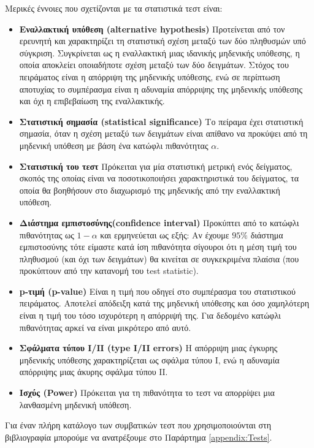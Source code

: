 Μερικές έννοιες που σχετίζονται με τα στατιστικά τεστ είναι:
\begin{itemize}
	\item \textbf{Εναλλακτική υπόθεση (alternative hypothesis)} Προτείνεται από τον ερευνητή και χαρακτηρίζει τη στατιστική σχέση μεταξύ των δύο πληθυσμών υπό σύγκριση. Συγκρίνεται ως η εναλλακτική μιας ιδανικής μηδενικής υπόθεσης, η οποία αποκλείει οποιαδήποτε σχέση μεταξύ των δύο δειγμάτων. Στόχος του πειράματος είναι η απόρριψη της μηδενικής υπόθεσης, ενώ σε περίπτωση αποτυχίας το συμπέρασμα είναι η αδυναμία απόρριψης της μηδενικής υπόθεσης και όχι η επιβεβαίωση της εναλλακτικής.
	\item \textbf{Στατιστική σημασία (statistical significance)} Το πείραμα έχει στατιστική σημασία, όταν η σχέση μεταξύ των δειγμάτων είναι απίθανο να προκύψει από τη μηδενική υπόθεση με βάση ένα κατώφλι πιθανότητας $\alpha$.
	\item \textbf{Στατιστική του τεστ} Πρόκειται για μία στατιστική μετρική ενός δείγματος, σκοπός της οποίας είναι να ποσοτικοποιήσει χαρακτηριστικά του δείγματος, τα οποία θα βοηθήσουν στο διαχωρισμό της μηδενικής από την εναλλακτική υπόθεση.
	\item \textbf{Διάστημα εμπιστοσύνης(confidence interval)}  Προκύπτει από το κατώφλι πιθανότητας ως $1-\alpha$ και ερμηνεύεται ως εξής: Αν έχουμε $95 \%$ διάστημα εμπιστοσύνης τότε είμαστε κατά ίση πιθανότητα σίγουροι ότι η μέση τιμή του πληθυσμού (και όχι των δειγμάτων) θα κινείται σε συγκεκριμένα πλαίσια (που προκύπτουν από την κατανομή του test statistic).
	\item \textbf{p-τιμή (p-value)} Είναι η τιμή που οδηγεί στο συμπέρασμα του στατιστικού πειράματος. Αποτελεί απόδειξη κατά της μηδενική υπόθεσης και όσο χαμηλότερη είναι η τιμή του τόσο ισχυρότερη η απόρριψή της. Για δεδομένο κατώφλι πιθανότητας αρκεί να είναι μικρότερο από αυτό.
	\item \textbf{Σφάλματα τύπου Ι/ΙΙ (type I/II errors)} Η απόρριψη μιας έγκυρης μηδενικής υπόθεσης χαρακτηρίζεται ως σφάλμα τύπου Ι, ενώ η αδυναμία απόρριψης μιας άκυρης σφάλμα τύπου ΙΙ.
	\item \textbf{Ισχύς (Power)} Πρόκειται για τη πιθανότητα το τεστ να απορρίψει μια λανθασμένη μηδενική υπόθεση.
\end{itemize}

Για έναν πλήρη κατάλογο των συμβατικών τεστ που χρησιμοποιούνται στη βιβλιογραφία μπορούμε να ανατρέξουμε στο Παράρτημα \ref{appendix:Tests}.
